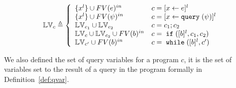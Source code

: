{\begin{defn}
\label{def:lvar}
{\footnotesize
$$
  \lvar_{c} \triangleq
  \left\{
  \begin{array}{ll}
      \{{x}^l\} \cup FV(\expr)^{in}                  
      & {c} = [{\assign x e}]^{l} 
      \\
      \{{x}^l\}   \cup FV(\qexpr)^{in}                
      & {c} = [{\assign x \query(\qexpr)}]^{l} 
      \\
      \lvar_{{c_1}} \cup \lvar_{{c_2}}  
      & {c} = {c_1};{c_2}
      \\
      \lvar_{{c}} \cup \lvar_{{c_2}} \cup FV(\bexpr)^{in}
      & {c} =\eif([\bexpr]^{l}, c_1, c_2) 
      \\
      \lvar_{{c}'} \cup FV(\bexpr)^{in}
      & {c}   = \ewhile ([\bexpr]^{l}, {c}')
\end{array}
\right.
$$
}
\end{defn}
%
%
%
We also defined the set of query variables for a program $c$,
it is the set of variables set to the result of a query in the program formally in Definition~\ref{def:qvar}.
%
}
